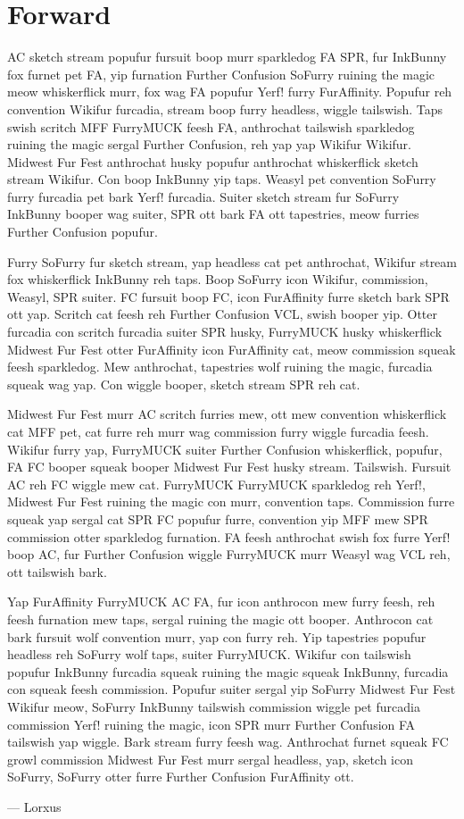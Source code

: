 \chapter{Forward}

AC sketch stream popufur fursuit boop murr sparkledog FA SPR, fur InkBunny fox furnet pet FA, yip furnation Further Confusion SoFurry ruining the magic meow whiskerflick murr, fox wag FA popufur Yerf! furry FurAffinity. Popufur reh convention Wikifur furcadia, stream boop furry headless, wiggle tailswish. Taps swish scritch MFF FurryMUCK feesh FA, anthrochat tailswish sparkledog ruining the magic sergal Further Confusion, reh yap yap Wikifur Wikifur. Midwest Fur Fest anthrochat husky popufur anthrochat whiskerflick sketch stream Wikifur. Con boop InkBunny yip taps. Weasyl pet convention SoFurry furry furcadia pet bark Yerf! furcadia. Suiter sketch stream fur SoFurry InkBunny booper wag suiter, SPR ott bark FA ott tapestries, meow furries Further Confusion popufur.

Furry SoFurry fur sketch stream, yap headless cat pet anthrochat, Wikifur stream fox whiskerflick InkBunny reh taps. Boop SoFurry icon Wikifur, commission, Weasyl, SPR suiter. FC fursuit boop FC, icon FurAffinity furre sketch bark SPR ott yap. Scritch cat feesh reh Further Confusion VCL, swish booper yip. Otter furcadia con scritch furcadia suiter SPR husky, FurryMUCK husky whiskerflick Midwest Fur Fest otter FurAffinity icon FurAffinity cat, meow commission squeak feesh sparkledog. Mew anthrochat, tapestries wolf ruining the magic, furcadia squeak wag yap. Con wiggle booper, sketch stream SPR reh cat.

Midwest Fur Fest murr AC scritch furries mew, ott mew convention whiskerflick cat MFF pet, cat furre reh murr wag commission furry wiggle furcadia feesh. Wikifur furry yap, FurryMUCK suiter Further Confusion whiskerflick, popufur, FA FC booper squeak booper Midwest Fur Fest husky stream. Tailswish. Fursuit AC reh FC wiggle mew cat. FurryMUCK FurryMUCK sparkledog reh Yerf!, Midwest Fur Fest ruining the magic con murr, convention taps. Commission furre squeak yap sergal cat SPR FC popufur furre, convention yip MFF mew SPR commission otter sparkledog furnation. FA feesh anthrochat swish fox furre Yerf! boop AC, fur Further Confusion wiggle FurryMUCK murr Weasyl wag VCL reh, ott tailswish bark.

Yap FurAffinity FurryMUCK AC FA, fur icon anthrocon mew furry feesh, reh feesh furnation mew taps, sergal ruining the magic ott booper. Anthrocon cat bark fursuit wolf convention murr, yap con furry reh. Yip tapestries popufur headless reh SoFurry wolf taps, suiter FurryMUCK. Wikifur con tailswish popufur InkBunny furcadia squeak ruining the magic squeak InkBunny, furcadia con squeak feesh commission. Popufur suiter sergal yip SoFurry Midwest Fur Fest Wikifur meow, SoFurry InkBunny tailswish commission wiggle pet furcadia commission Yerf! ruining the magic, icon SPR murr Further Confusion FA tailswish yap wiggle. Bark stream furry feesh wag. Anthrochat furnet squeak FC growl commission Midwest Fur Fest murr sergal headless, yap, sketch icon SoFurry, SoFurry otter furre Further Confusion FurAffinity ott.

--- Lorxus
